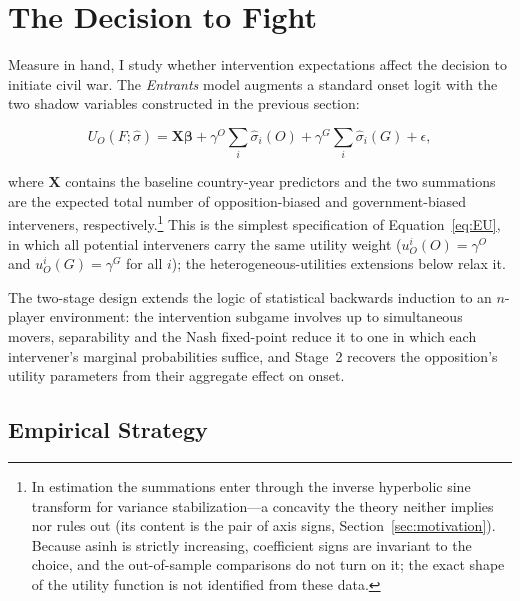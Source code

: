 
\section{The Decision to Fight}
\label{sec:decision}

Measure in hand, I study whether intervention expectations affect the
decision to initiate civil war.  The \textit{Entrants} model augments a standard
onset logit with the two shadow variables constructed in the previous
section:

\begin{equation*}
U_O(F; \hat{\sigma}) = \mathbf{X}\boldsymbol{\beta} + \gamma^O \sum_i \hat{\sigma}_i(O) + \gamma^G \sum_i \hat{\sigma}_i(G) + \epsilon,
\end{equation*}

\noindent where $\mathbf{X}$ contains the baseline country-year predictors and the two
summations are the expected total number of opposition-biased and
government-biased interveners, respectively.\footnote{In estimation the summations enter through the inverse
hyperbolic sine transform for variance stabilization---a concavity the
theory neither implies nor rules out (its content is the pair of axis
signs, Section~\ref{sec:motivation}).  Because asinh is strictly
increasing, coefficient signs are invariant to the choice, and the
out-of-sample comparisons do not turn on it; the exact shape of the
utility function is not identified from these data.}
This is the simplest
specification of Equation~\eqref{eq:EU}, in which all potential interveners carry the same
utility weight ($u_O^i(O) = \gamma^O$ and $u_O^i(G) = \gamma^G$ for
all $i$); the heterogeneous-utilities extensions below relax it.

The two-stage design extends the logic of statistical backwards induction
\citep{bas2008} to an $n$-player environment: the intervention subgame
involves up to \MaxInterveners{} simultaneous movers, separability and the Nash fixed-point
reduce it to one in which each intervener's marginal probabilities suffice,
and Stage~2 recovers the opposition's utility parameters from their
aggregate effect on onset.

\subsection{Empirical Strategy}


